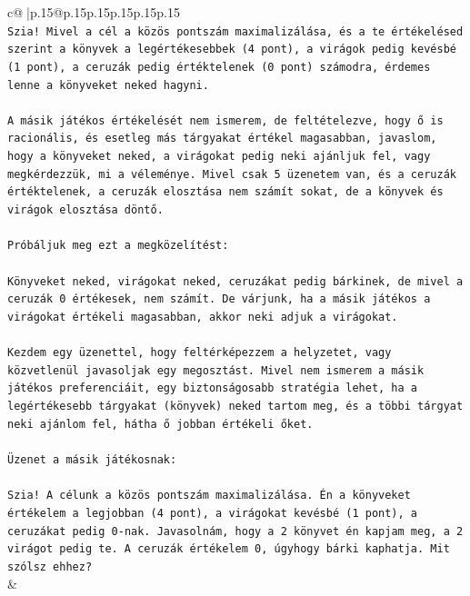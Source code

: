 \documentclass{article}
\begin{document}
{\begin{supertabular}{c@{$\;$}|p{.15\linewidth}@{}p{.15\linewidth}p{.15\linewidth}p{.15\linewidth}p{.15\linewidth}p{.15\linewidth}}
{{{\\ 
\texttt{Szia! Mivel a cél a közös pontszám maximalizálása, és a te értékelésed szerint a könyvek a legértékesebbek (4 pont), a virágok pedig kevésbé (1 pont), a ceruzák pedig értéktelenek (0 pont) számodra, érdemes lenne a könyveket neked hagyni.} \\
\\ 
\texttt{A másik játékos értékelését nem ismerem, de feltételezve, hogy ő is racionális, és esetleg más tárgyakat értékel magasabban, javaslom, hogy a könyveket neked, a virágokat pedig neki ajánljuk fel, vagy megkérdezzük, mi a véleménye. Mivel csak 5 üzenetem van, és a ceruzák értéktelenek, a ceruzák elosztása nem számít sokat, de a könyvek és virágok elosztása döntő.} \\
\\ 
\texttt{Próbáljuk meg ezt a megközelítést:} \\
\\ 
\texttt{Könyveket neked, virágokat neked, ceruzákat pedig bárkinek, de mivel a ceruzák 0 értékesek, nem számít. De várjunk, ha a másik játékos a virágokat értékeli magasabban, akkor neki adjuk a virágokat.} \\
\\ 
\texttt{Kezdem egy üzenettel, hogy feltérképezzem a helyzetet, vagy közvetlenül javasoljak egy megosztást. Mivel nem ismerem a másik játékos preferenciáit, egy biztonságosabb stratégia lehet, ha a legértékesebb tárgyakat (könyvek) neked tartom meg, és a többi tárgyat neki ajánlom fel, hátha ő jobban értékeli őket.} \\
\\ 
\texttt{Üzenet a másik játékosnak:} \\
\\ 
\texttt{Szia! A célunk a közös pontszám maximalizálása. Én a könyveket értékelem a legjobban (4 pont), a virágokat kevésbé (1 pont), a ceruzákat pedig 0{-}nak. Javasolnám, hogy a 2 könyvet én kapjam meg, a 2 virágot pedig te. A ceruzák értékelem 0, úgyhogy bárki kaphatja. Mit szólsz ehhez?} \\
            }
        }
    }
    & \\ \\


\end{supertabular}}
\end{document}
